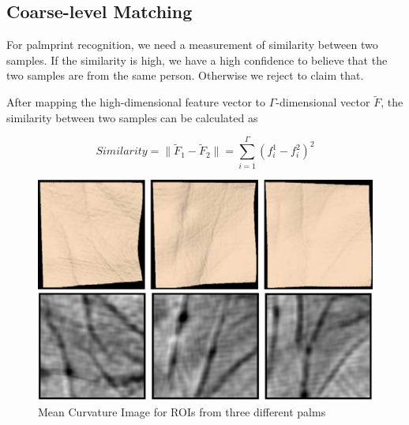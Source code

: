\subsection{Coarse-level Matching}
\label{ssec:methodology:naive}

For palmprint recognition, we need a measurement of similarity between two samples. If the similarity is high, we have a high confidence to believe that the two samples are from the same person. Otherwise we reject to claim that.

After mapping the high-dimensional feature vector to $\Gamma$-dimensional vector $\tilde{F}$, the similarity between two samples can be calculated as

\begin{equation}
Similarity= \| \tilde{F}_1 -\tilde{F}_2 \|
= \sum \limits_{i=1}^{\Gamma} (f_i^1-f_i^2)^2
\label{eq:methodology:similarity}
\end{equation}

\begin{figure}[htb]
  \begin{center}
    \includegraphics[width=0.9\linewidth]{ch-methodology/figures/mci1}
    \caption[MCI for ROIs from different palms]{Mean Curvature Image for ROIs from three different palms}    \label{fig:methodology:mci1}
  \end{center}
\end{figure}

